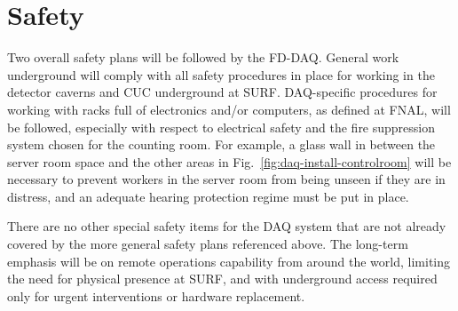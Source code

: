 \section{Safety}
\label{sec:fd-daq-safety}

Two overall safety plans will be followed by the FD-DAQ. General work underground will comply with all safety procedures in place for working in the detector caverns and CUC underground at SURF. DAQ-specific procedures for working with racks full of electronics and/or computers, as defined at FNAL, will be followed, especially with respect to electrical safety and the fire suppression system chosen for the counting room. For example, a glass wall in between the server room space and the other areas in Fig.~\ref{fig:daq-install-controlroom} will be necessary to prevent workers in the server room from being unseen if they are in distress, and an adequate hearing protection regime must be put in place.

There are no other special safety items for the DAQ system that are not already covered by the more general safety plans referenced above. The long-term emphasis will be on remote operations capability from around the world, limiting the need for physical presence at SURF, and with underground access required only for urgent interventions or hardware replacement.
